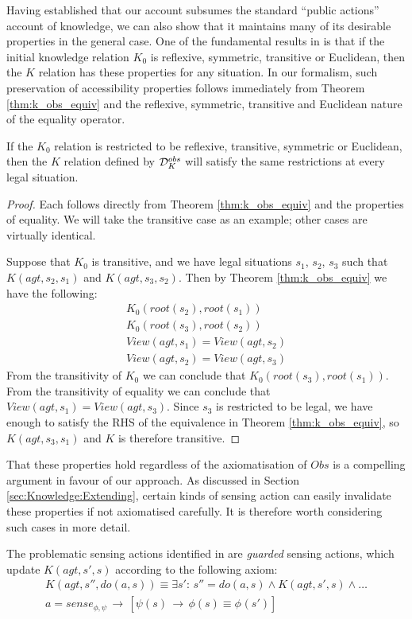 Having established that our account subsumes the standard {}``public
actions'' account of knowledge, we can also show that it maintains
many of its desirable properties in the general case. One of the fundamental
results in \citep{scherl03sc_knowledge} is that if the initial knowledge
relation $K_{0}$ is reflexive, symmetric, transitive or Euclidean,
then the $K$ relation has these properties for any situation. In
our formalism, such preservation of accessibility properties follows
immediately from Theorem \ref{thm:k_obs_equiv} and the reflexive,
symmetric, transitive and Euclidean nature of the equality operator. 
\begin{thm}
If the $K_{0}$ relation is restricted to be reflexive, transitive,
symmetric or Euclidean, then the $K$ relation defined by $\mathcal{D}_{K}^{obs}$
will satisfy the same restrictions at every legal situation. \label{thm:Knowledge:Accessibility} \end{thm}
\begin{proof}
Each follows directly from Theorem \ref{thm:k_obs_equiv} and the
properties of equality. We will take the transitive case as an example;
other cases are virtually identical.

Suppose that $K_{0}$ is transitive, and we have legal situations
$s_{1}$, $s_{2}$, $s_{3}$ such that $K(agt,s_{2},s_{1})$ and $K(agt,s_{3},s_{2})$.
Then by Theorem \ref{thm:k_obs_equiv} we have the following:\begin{gather*}
K_{0}(root(s_{2}),root(s_{1}))\\
K_{0}(root(s_{3}),root(s_{2}))\\
View(agt,s_{1})=View(agt,s_{2})\\
View(agt,s_{2})=View(agt,s_{3})\end{gather*}
 From the transitivity of $K_{0}$ we can conclude that $K_{0}(root(s_{3}),root(s_{1}))$.
From the transitivity of equality we can conclude that $View(agt,s_{1})=View(agt,s_{3})$.
Since $s_{3}$ is restricted to be legal, we have enough to satisfy
the RHS of the equivalence in Theorem \ref{thm:k_obs_equiv}, so $K(agt,s_{3},s_{1})$
and $K$ is therefore transitive. 
\end{proof}
That these properties hold regardless of the axiomatisation of $Obs$
is a compelling argument in favour of our approach. As discussed in
Section \ref{sec:Knowledge:Extending}, certain kinds of sensing action
can easily invalidate these properties if not axiomatised carefully.
It is therefore worth considering such cases in more detail.

The problematic sensing actions identified in \citep{Petrick06thesis}
are \emph{guarded} sensing actions, which update $K(agt,s',s)$ according
to the following axiom:\begin{gather*}
K(agt,s'',do(a,s))\equiv\exists s':\, s''=do(a,s)\wedge K(agt,s',s)\wedge\dots\\
a=sense_{\phi,\psi}\,\rightarrow\,\left[\psi(s)\,\rightarrow\,\phi(s)\equiv\phi_{}(s')\right]\end{gather*}


